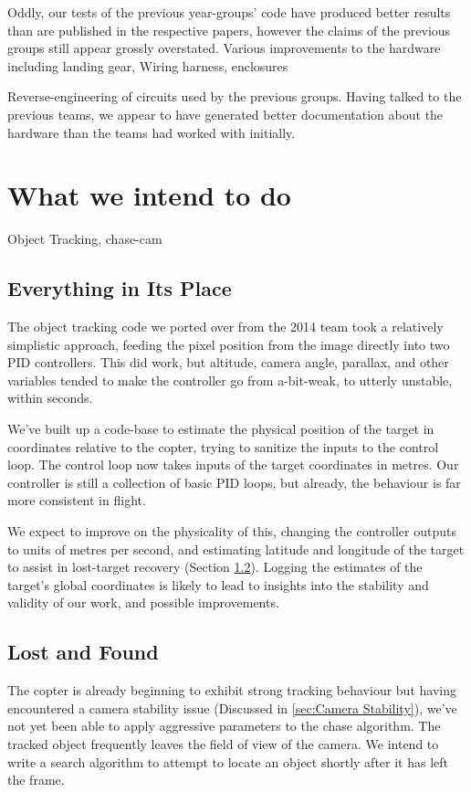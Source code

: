 \documentclass[11pt]{article}
\begin{document}
    Oddly, our tests of the previous year-groups' code have produced better results than are published in the respective papers, however the claims of the previous groups still appear grossly overstated.
    Various improvements to the hardware including landing gear, Wiring harness, enclosures

    Reverse-engineering of circuits used by the previous groups. Having talked to the previous teams, we appear to have generated better documentation about the hardware than the teams had worked with initially.


  \section{What we intend to do}
    Object Tracking, chase-cam
    \subsection{Everything in Its Place}
      The object tracking code we ported over from the 2014 team took a relatively simplistic approach, feeding the pixel position from the image directly into two PID controllers.  This did work, but altitude, camera angle, parallax, and other variables tended to make the controller go from a-bit-weak, to utterly unstable, within seconds.

      We've built up a code-base to estimate the physical position of the target in coordinates relative to the copter, trying to sanitize the inputs to the control loop. The control loop now takes inputs of the target coordinates in metres.  Our controller is still a collection of basic PID loops, but already, the behaviour is far more consistent in flight.

      We expect to improve on the physicality of this, changing the controller outputs to units of metres per second, and estimating latitude and longitude of the target to assist in lost-target recovery (Section \ref{sec:Lost and Found}).  Logging the estimates of the target's global coordinates is likely to lead to insights into the stability and validity of our work, and possible improvements.


    \subsection{Lost and Found}
    \label{sec:Lost and Found}
      The copter is already beginning to exhibit strong tracking behaviour but having encountered a camera stability issue (Discussed in \ref{sec:Camera Stability}), we've not yet been able to apply aggressive parameters to the chase algorithm.  The tracked object frequently leaves the field of view of the camera.
      We intend to write a search algorithm to attempt to locate an object shortly after it has left the frame.
\end{document}
